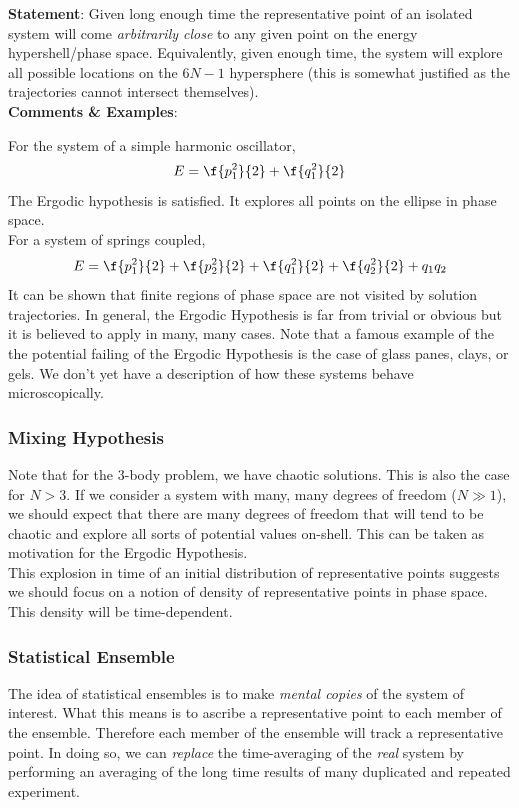 \documentclass{article}
\begin{document}
\textbf{Statement}: Given long enough time the representative point of an isolated system will come \textit{arbitrarily close} to any given point on the energy hypershell/phase space. Equivalently, given enough time, the system will explore all possible locations on the $6N-1$ hypersphere (this is somewhat justified as the trajectories cannot intersect themselves). \\

\textbf{Comments \& Examples}:

For the system of a simple harmonic oscillator,
\[ E = \f{p_1^2}{2} + \f{q_1^2}{2} \]
The Ergodic hypothesis is satisfied. It explores all points on the ellipse in phase space.\\

For a system of springs coupled,
\[ E = \f{p_1^2}{2} + \f{p_2^2}{2} + \f{q_1^2}{2} + \f{q_2^2}{2} + q_1q_2 \]
It can be shown that finite regions of phase space are not visited by solution trajectories. In general, the Ergodic Hypothesis is far from trivial or obvious but it is believed to apply in many, many cases. Note that a famous example of the the potential failing of the Ergodic Hypothesis is the case of glass panes, clays, or gels. We don't yet have a description of how these systems behave microscopically. \\

\subsubsection{Mixing Hypothesis}

Note that for the $3$-body problem, we have chaotic solutions. This is also the case for $N > 3$. If we consider a system with many, many degrees of freedom ($N \gg 1$), we should expect that there are many degrees of freedom that will tend to be chaotic and explore all sorts of potential values on-shell. This can be taken as motivation for the Ergodic Hypothesis. \\

This explosion in time of an initial distribution of representative points suggests we should focus on a notion of density of representative points in phase space. This density will be time-dependent.

\subsubsection{Statistical Ensemble}
The idea of statistical ensembles is to make \textit{mental copies} of the system of interest. What this means is to ascribe a representative point to each member of the ensemble. Therefore each member of the ensemble will track a representative point. In doing so, we can \textit{replace} the time-averaging of the \textit{real} system by performing an averaging of the long time results of many duplicated and repeated experiment.
\end{document}
